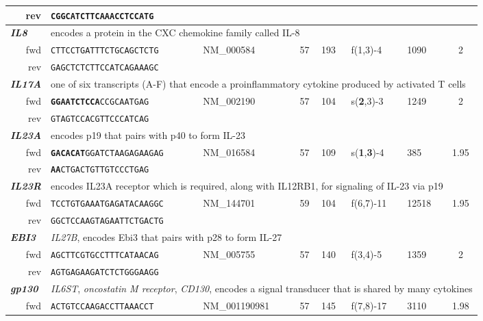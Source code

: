 \documentclass[12pt,a4paper]{scrreprt} %
\begin{document}
\begin{table}[htbp]
{\begin{tabular}{rllclllc}
\ rev & \texttt{CGGCATCTTCAAAC\textbf{CTCCATG}} & & &  &  &  &  \\ 
\hline \multicolumn{1}{l}{\textit{\textbf{IL8}}} & \multicolumn{7}{l}{encodes a protein in the CXC chemokine family called IL-8} \\ 
\ fwd & \texttt{CTTCCTGATTTCTGCAGCTCTG} & NM\_000584 & 57 & 193 & f(1,3)-4 & 1090 & 2 \\ 
\ rev & \texttt{GAGCTCTCTTCCATCAGAAAGC} &  &  &  &  &  &  \\ 
\hline \multicolumn{1}{l}{\textit{\textbf{IL17A}}} & \multicolumn{7}{l}{one of six transcripts (A-F) that encode a proinflammatory cytokine produced by activated T cells} \\ 
\ fwd & \texttt{\textbf{GGAATCTCCA}CCGCAATGAG} & NM\_002190 & 57 & 104 & s(\textbf{2},3)-3 & 1249 & 2 \\ 
\ rev & \texttt{GTAGTCCACGTTCCCATCAG} &  &  &  &  &  &  \\ 
\hline \multicolumn{1}{l}{\textit{\textbf{IL23A}}} & \multicolumn{7}{l}{encodes p19    that pairs with p40 to form IL-23} \\ 
\ fwd & \texttt{\textbf{GACACAT}GGATCTAAGAGAAGAG} & NM\_016584 & 57 & 109  & s(\textbf{1},\textbf{3})-4 & 385 & 1.95 \\ 
\ rev & \texttt{\textbf{AA}CTGACTGTTGTCCCTGAG} &  &  &  &  &  &  \\ 
\hline \multicolumn{1}{l}{\textit{\textbf{IL23R}}} & \multicolumn{7}{l}{encodes IL23A receptor which is required, along with IL12RB1, for signaling of IL-23 via p19} \\ 
\ fwd & \texttt{TCCTGTGAAATGAGATACAAGGC} & NM\_144701 & 59 & 104 & f(6,7)-11 & 12518 & 1.95 \\ 
\ rev & \texttt{GGCTCCAAGTAGAATTCTGACTG} &  &  &  &  &  &  \\ 
\hline \multicolumn{1}{l}{\textit{\textbf{EBI3}}} & \multicolumn{7}{l}{\textit{IL27B}, encodes Ebi3 that pairs with p28 to form IL-27} \\ 
\ fwd & \texttt{AGCTTCGTGCCTTTCATAACAG} & NM\_005755 & 57 & 140 & f(3,4)-5 & 1359 & 2 \\ 
\ rev & \texttt{AGTGAGAAGATCTCTGGGAAGG} &  &  &  &  &  &  \\ 
\hline \multicolumn{1}{l}{\textit{\textbf{gp130}}} & \multicolumn{7}{l}{\textit{IL6ST}, \textit{oncostatin M receptor}, \textit{CD130}, encodes a signal transducer that is shared by many cytokines} \\ 
\ fwd & \texttt{ACTGTCCAAGACCTTAAACCT} & NM\_001190981 & 57 & 145 & f(7,8)-17 & 3110 & 1.98 \\ 

\end{tabular}}
\end{table}
\end{document}
